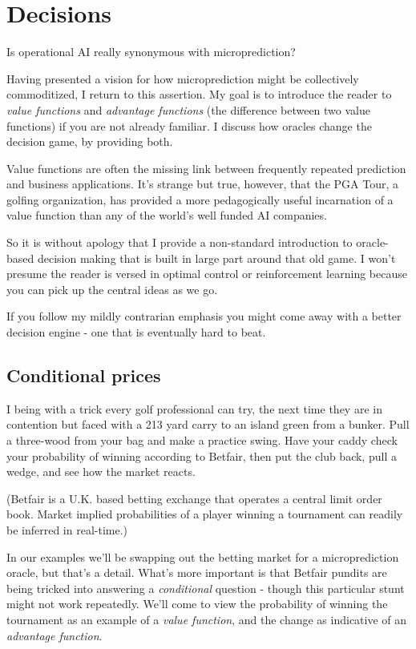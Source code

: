 \chapter{Decisions}
\label{chapter:decisions}

Is operational AI really synonymous with microprediction? 

Having presented a vision for how microprediction might be collectively commoditized, I return to this assertion. My goal is to introduce the reader to {\em value functions} and {\em advantage functions} (the difference between two value functions) if you are not already familiar. I discuss how oracles change the decision game, by providing both.    

Value functions are often the missing link between frequently repeated prediction and business applications. It's strange but true, however, that the PGA Tour, a golfing organization, has provided a more pedagogically useful incarnation of a value function than any of the world's well funded AI companies.   

So it is without apology that I provide a non-standard introduction to oracle-based decision making that is built in large part around that old game. I won't presume the reader is versed in optimal control or reinforcement learning because you can pick up the central ideas as we go. 

If you follow my mildly contrarian emphasis you might come away with a better decision engine - one that is eventually hard to beat. 

\section{Conditional prices}

I being with a trick every golf professional can try, the next time they are in contention but faced with a 213 yard carry to an island green from a bunker. Pull a three-wood from your bag and make a practice swing. Have your caddy check your probability of winning according to Betfair, then put the club back, pull a wedge, and see how the market reacts.

(Betfair is a U.K. based betting exchange that operates a central limit order book. Market implied probabilities of a player winning a tournament can readily be inferred in real-time.)

In our examples we'll be swapping out the betting market for a microprediction oracle, but that's a detail. What's more important is that Betfair pundits are being tricked into answering a {\em conditional} question - though this particular stunt might not work repeatedly. We'll come to view the probability of winning the tournament as an example of a {\em value function}, and the change as indicative of an {\em advantage function}.  


